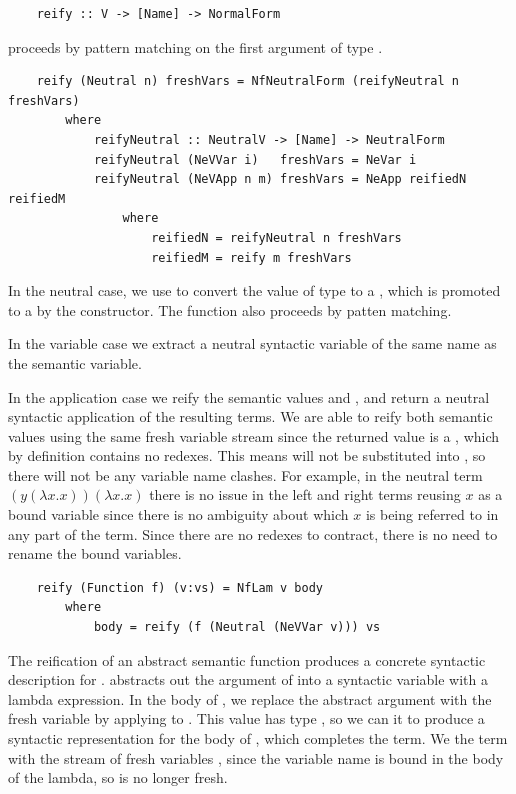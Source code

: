 \begin{lstlisting}
    reify :: V -> [Name] -> NormalForm
\end{lstlisting}

 proceeds by pattern matching on the first argument of type . 

\begin{lstlisting}
    reify (Neutral n) freshVars = NfNeutralForm (reifyNeutral n freshVars)
        where
            reifyNeutral :: NeutralV -> [Name] -> NeutralForm
            reifyNeutral (NeVVar i)   freshVars = NeVar i
            reifyNeutral (NeVApp n m) freshVars = NeApp reifiedN reifiedM
                where
                    reifiedN = reifyNeutral n freshVars
                    reifiedM = reify m freshVars
\end{lstlisting}

In the neutral case, we use  to convert the value  of type  to a , which is promoted to a  by the  constructor. The  function also proceeds by patten matching. 

In the variable case we extract a neutral syntactic variable of the same name as the semantic variable. 

In the application case we reify the semantic values  and , and return a neutral syntactic application of the resulting terms.
We are able to reify both semantic values using the same fresh variable stream since the returned value is a , which by definition contains no redexes. This means  will not be substituted into , so there will not be any variable name clashes.
For example, in the neutral term $(y(\lambda x.x))(\lambda x . x)$ there is no issue in the left and right terms reusing $x$ as a bound variable since there is no ambiguity about which $x$ is being referred to in any part of the term. Since there are no redexes to contract, there is no need to rename the bound variables.


\begin{lstlisting}
    reify (Function f) (v:vs) = NfLam v body
        where 
            body = reify (f (Neutral (NeVVar v))) vs
\end{lstlisting}

The reification of an abstract semantic function  produces a concrete syntactic description for .  abstracts out the argument of  into a syntactic variable  with a lambda expression. In the body of , we replace the abstract argument with the fresh variable  by applying  to . This value has type , so we can  it to produce a syntactic representation for the body of , which completes the term. We  the term with the stream of fresh variables , since the variable name  is bound in the body of the lambda, so is no longer fresh.

